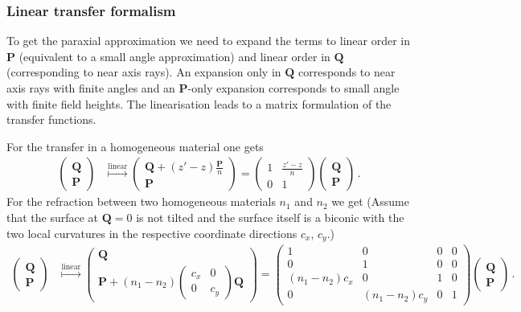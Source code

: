 \documentclass[12pt,a4paper,twoside,openright,BCOR10mm,headsepline,titlepage,abstracton,chapterprefix,final]{scrreprt}
\newcommand\Vector[1]{{\mathbf{#1}}}
\begin{document}
\subsubsection{Linear transfer formalism}

To get the paraxial approximation we need to expand the terms to linear order in $\Vector{P}$ (equivalent to a small angle approximation) and linear order in $\Vector{Q}$
(corresponding to near axis rays). An expansion only in $\Vector{Q}$ corresponds to near axis rays with finite angles and an $\Vector{P}$-only expansion corresponds to
small angle with finite field heights. The linearisation leads to a matrix formulation of the transfer functions.

For the transfer in a homogeneous material one gets
\begin{align}
 \begin{pmatrix}
  \Vector{Q} \\
  \Vector{P}
 \end{pmatrix} &\stackrel{\text{linear}}{\mapsto}
 \begin{pmatrix}
  \Vector{Q} + (z' -z) \frac{\Vector{P}}{n} \\
  \Vector{P}
 \end{pmatrix} =
 \begin{pmatrix}
  1 & \frac{z' - z}{n} \\
  0 & 1
 \end{pmatrix}
 \begin{pmatrix}
  \Vector{Q} \\
  \Vector{P}
 \end{pmatrix} 
\,.
\end{align}
For the refraction between two homogeneous materials $n_1$ and $n_2$ we get (Assume that the surface at $\Vector{Q}=0$ is not tilted and the surface
itself is a biconic with the two local curvatures in the respective coordinate directions $c_x$, $c_y$.)
\begin{align}
 \begin{pmatrix}
  \Vector{Q} \\
  \Vector{P}
 \end{pmatrix} &\stackrel{\text{linear}}{\mapsto}
 \begin{pmatrix}
  \Vector{Q} \\
  \Vector{P} + (n_1 - n_2) \begin{pmatrix} c_x & 0 \\ 0 & c_y \end{pmatrix}  \Vector{Q}
 \end{pmatrix} =
 \begin{pmatrix}
  1 & 0 & 0 & 0 \\
  0 & 1 & 0 & 0 \\
  (n_1 - n_2)c_x & 0 & 1 & 0   \\
  0 & (n_1 - n_2)c_y & 0 & 1  
 \end{pmatrix}
 \begin{pmatrix}
  \Vector{Q} \\
  \Vector{P}
 \end{pmatrix} 
\,.
\end{align}
\end{document}
